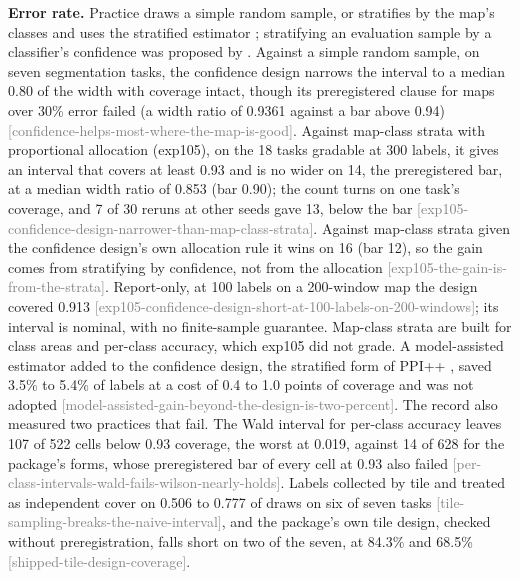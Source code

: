 \documentclass[11pt,a4paper]{article}
\newcommand{\claim}[1]{{\scriptsize\textsf{\textcolor{gray}{[#1]}}}}
\begin{document}
\textbf{Error rate.} Practice draws a simple random sample, or stratifies by the map's classes and uses the stratified
estimator \citep{olofsson2014}; stratifying an evaluation sample by a classifier's confidence was proposed by
\citet{kumar2016}. Against a simple random sample, on seven segmentation tasks, the confidence design narrows the
interval to a median 0.80 of the width with coverage intact, though its preregistered clause for maps over 30\% error
failed (a width ratio of 0.9361 against a bar above 0.94) \claim{confidence-helps-most-where-the-map-is-good}. Against
map-class strata with proportional allocation (exp105), on the 18 tasks gradable at 300 labels, it gives an interval
that covers at least 0.93 and is no wider on 14, the preregistered bar, at a median width ratio of 0.853 (bar 0.90); the
count turns on one task's coverage, and 7 of 30 reruns at other seeds gave 13, below the bar
\claim{exp105-confidence-design-narrower-than-map-class-strata}. Against map-class strata given the confidence design's
own allocation rule it wins on 16 (bar 12), so the gain comes from stratifying by confidence, not from the allocation
\claim{exp105-the-gain-is-from-the-strata}. Report-only, at 100 labels on a 200-window map the design covered 0.913
\claim{exp105-confidence-design-short-at-100-labels-on-200-windows}; its interval is nominal, with no finite-sample
guarantee. Map-class strata are built for class areas and per-class accuracy, which exp105 did not grade. A
model-assisted estimator added to the confidence design, the stratified form \citep{fisch2024} of PPI++
\citep{angelopoulos2023ppipp}, saved 3.5\% to 5.4\% of labels at a cost of 0.4 to 1.0 points of coverage and was not
adopted \claim{model-assisted-gain-beyond-the-design-is-two-percent}. The record also measured two practices that fail.
The Wald interval for per-class accuracy leaves 107 of 522 cells below 0.93 coverage, the worst at 0.019, against 14 of
628 for the package's forms, whose preregistered bar of every cell at 0.93 also failed
\claim{per-class-intervals-wald-fails-wilson-nearly-holds}. Labels collected by tile and treated as independent cover on
0.506 to 0.777 of draws on six of seven tasks \claim{tile-sampling-breaks-the-naive-interval}, and the package's own
tile design, checked without preregistration, falls short on two of the seven, at 84.3\% and 68.5\%
\claim{shipped-tile-design-coverage}.
\end{document}
